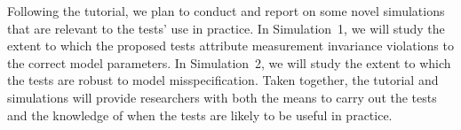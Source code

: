 \documentclass[11pt]{article}
\begin{document}
Following the tutorial, we plan to conduct and report on some novel simulations
that are relevant to the tests' use in practice. In Simulation~1, we will study
the extent to which the proposed tests attribute measurement invariance
violations to the correct model parameters. In Simulation~2, we will study the
extent to which the tests are robust to model misspecification. Taken together,
the tutorial and simulations will provide researchers with both the means to
carry out the tests and the knowledge of when the tests are likely to be useful
in practice. 



\end{document}
